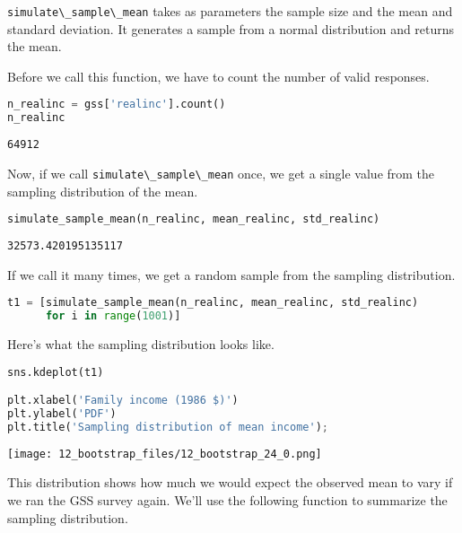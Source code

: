 \passthrough{\lstinline!simulate\_sample\_mean!} takes as parameters the
sample size and the mean and standard deviation. It generates a sample
from a normal distribution and returns the mean.

Before we call this function, we have to count the number of valid
responses.

\begin{lstlisting}[language=Python,style=source]
n_realinc = gss['realinc'].count()
n_realinc
\end{lstlisting}

\begin{lstlisting}[style=output]
64912
\end{lstlisting}

Now, if we call \passthrough{\lstinline!simulate\_sample\_mean!} once,
we get a single value from the sampling distribution of the mean.

\begin{lstlisting}[language=Python,style=source]
simulate_sample_mean(n_realinc, mean_realinc, std_realinc)
\end{lstlisting}

\begin{lstlisting}[style=output]
32573.420195135117
\end{lstlisting}

If we call it many times, we get a random sample from the sampling
distribution.

\begin{lstlisting}[language=Python,style=source]
t1 = [simulate_sample_mean(n_realinc, mean_realinc, std_realinc)
      for i in range(1001)]
\end{lstlisting}

Here's what the sampling distribution looks like.

\begin{lstlisting}[language=Python,style=source]
sns.kdeplot(t1)

plt.xlabel('Family income (1986 $)')
plt.ylabel('PDF')
plt.title('Sampling distribution of mean income');
\end{lstlisting}

\begin{center}
\texttt{[image: 12\_bootstrap\_files/12\_bootstrap\_24\_0.png]}
\end{center}

This distribution shows how much we would expect the observed mean to
vary if we ran the GSS survey again. We'll use the following function to
summarize the sampling distribution.

